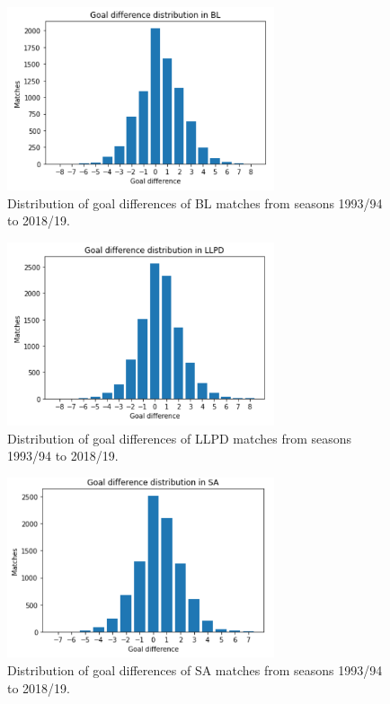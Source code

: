 \documentclass[thesis=M,english]{FITthesis}[2019/12/23]
\begin{document}
\begin{figure}[h]
    \centering
    \includegraphics[width=0.7\textwidth]{figures/bl_gd.png}
    \caption{Distribution of goal differences of BL matches from seasons 1993/94 to 2018/19.}
    \label{fig:bl_gd}
\end{figure}
\begin{figure}[h]
    \centering
    \includegraphics[width=0.7\textwidth]{figures/llpd_gd.png}
    \caption{Distribution of goal differences of LLPD matches from seasons 1993/94 to 2018/19.}
    \label{fig:llpd_gd}
\end{figure}
\begin{figure}[h]
    \centering
    \includegraphics[width=0.7\textwidth]{figures/sa_gd.png}
    \caption{Distribution of goal differences of SA matches from seasons 1993/94 to 2018/19.}
    \label{fig:sa_gd}
\end{figure}
\end{document}
